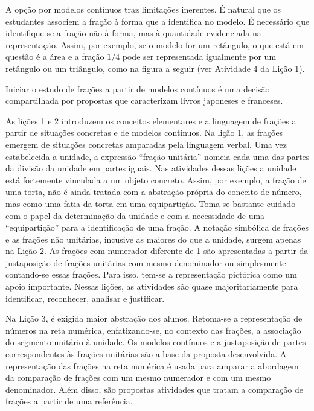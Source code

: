 A opção por modelos contínuos traz limitações inerentes. É natural que os estudantes associem a fração à forma que a identifica no modelo. É necessário que identifique-se a fração não à forma, mas à quantidade evidenciada na representação. Assim, por exemplo, se o modelo for um retângulo, o que está em questão é a área e a fração $1/4$ pode ser representada igualmente por um retângulo ou um triângulo, como na figura a seguir (ver Atividade 4 da Lição 1).

Iniciar o estudo de frações a partir de modelos contínuos é uma decisão compartilhada por propostas que caracterizam livros japoneses e franceses.

\begin{center}
\end{center}

As lições 1 e 2 introduzem os conceitos elementares e a linguagem de frações a partir de situações concretas e de modelos contínuos. Na lição 1, as frações emergem de situações concretas amparadas pela linguagem verbal. Uma vez estabelecida a unidade, a expressão ``fração unitária'' nomeia cada uma das partes da divisão da unidade em partes iguais. Nas atividades dessas lições a unidade está fortemente vinculada a um objeto concreto. Assim, por exemplo, a fração de uma torta, não é ainda tratada com a abstração própria do conceito de número, mas como uma fatia da torta em uma equipartição. Toma-se bastante cuidado com o papel da determinação da unidade e com a necessidade de uma ``equipartição'' para a identificação de uma fração. A notação simbólica de frações e as frações não unitárias, incusive as maiores do que a unidade, surgem apenas na Lição 2. As frações com numerador diferente de 1 são apresentadas a partir da justaposição de frações unitárias com mesmo denominador ou simplesmente contando-se essas frações. Para isso, tem-se a representação pictórica como um apoio importante. Nessas lições, as atividades são quase majoritariamente para identificar, reconhecer, analisar e justificar.

Na Lição 3, é exigida maior abstração dos alunos. Retoma-se a representação de números na reta numérica, enfatizando-se, no contexto das frações, a associação do segmento unitário à unidade. Os modelos contínuos e a justaposição de partes correspondentes às frações unitárias são a base da proposta desenvolvida. A representação das frações na reta numérica é usada para amparar a abordagem da comparação de frações com um mesmo numerador e com um mesmo denominador. Além disso, são propostas atividades que tratam a comparação de frações a partir de uma referência.

